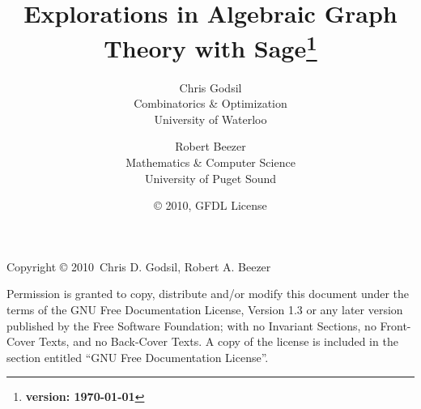 \documentclass[twoside, openright, 12pt]{book}
\author{
Chris Godsil\\
Combinatorics \& Optimization\\
University of Waterloo
\and
Robert Beezer\\
Mathematics \& Computer Science\\
University of Puget Sound}
\title{\bf Explorations in Algebraic Graph Theory with Sage\footnote{\textbf{version: \today}}}
\date{\copyright{} 2010, GFDL License}
\numberwithin{equation}{section}
\begin{document}
\maketitle
%
\noindent Copyright \copyright{} 2010\ Chris D. Godsil, Robert A. Beezer
\par\bigskip
%
\noindent Permission is granted to copy, distribute and/or
modify this document under the terms of the GNU
Free Documentation License, Version 1.3 or any
later version published by the Free Software
Foundation; with no Invariant Sections, no Front-Cover
Texts, and no Back-Cover Texts. A copy of the license
is included in the section entitled ``GNU Free
Documentation License''.
\clearpage
%

%
\tableofcontents
\clearpage{} %






%

%
\end{document}
